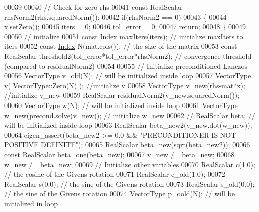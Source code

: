 \begin{DoxyCode}
00039 
00040             \textcolor{comment}{// Check for zero rhs}
00041             \textcolor{keyword}{const} RealScalar rhsNorm2(rhs.squaredNorm());
00042             \textcolor{keywordflow}{if}(rhsNorm2 == 0)
00043             \{
00044                 x.setZero();
00045                 iters = 0;
00046                 tol\_error = 0;
00047                 \textcolor{keywordflow}{return};
00048             \}
00049             
00050             \textcolor{comment}{// initialize}
00051             \textcolor{keyword}{const} \hyperlink{namespace_eigen_a62e77e0933482dafde8fe197d9a2cfde}{Index} maxIters(iters);  \textcolor{comment}{// initialize maxIters to iters}
00052             \textcolor{keyword}{const} \hyperlink{namespace_eigen_a62e77e0933482dafde8fe197d9a2cfde}{Index} N(mat.cols());    \textcolor{comment}{// the size of the matrix}
00053             \textcolor{keyword}{const} RealScalar threshold2(tol\_error*tol\_error*rhsNorm2); \textcolor{comment}{// convergence threshold (compared
       to residualNorm2)}
00054             
00055             \textcolor{comment}{// Initialize preconditioned Lanczos}
00056             VectorType v\_old(N); \textcolor{comment}{// will be initialized inside loop}
00057             VectorType v( VectorType::Zero(N) ); \textcolor{comment}{//initialize v}
00058             VectorType v\_new(rhs-mat*x); \textcolor{comment}{//initialize v\_new}
00059             RealScalar residualNorm2(v\_new.squaredNorm());
00060             VectorType w(N); \textcolor{comment}{// will be initialized inside loop}
00061             VectorType w\_new(precond.solve(v\_new)); \textcolor{comment}{// initialize w\_new}
00062 \textcolor{comment}{//            RealScalar beta; // will be initialized inside loop}
00063             RealScalar beta\_new2(v\_new.dot(w\_new));
00064             eigen\_assert(beta\_new2 >= 0.0 && \textcolor{stringliteral}{"PRECONDITIONER IS NOT POSITIVE DEFINITE"});
00065             RealScalar beta\_new(sqrt(beta\_new2));
00066             \textcolor{keyword}{const} RealScalar beta\_one(beta\_new);
00067             v\_new /= beta\_new;
00068             w\_new /= beta\_new;
00069             \textcolor{comment}{// Initialize other variables}
00070             RealScalar c(1.0); \textcolor{comment}{// the cosine of the Givens rotation}
00071             RealScalar c\_old(1.0);
00072             RealScalar s(0.0); \textcolor{comment}{// the sine of the Givens rotation}
00073             RealScalar s\_old(0.0); \textcolor{comment}{// the sine of the Givens rotation}
00074             VectorType p\_oold(N); \textcolor{comment}{// will be initialized in loop}

\end{DoxyCode}

